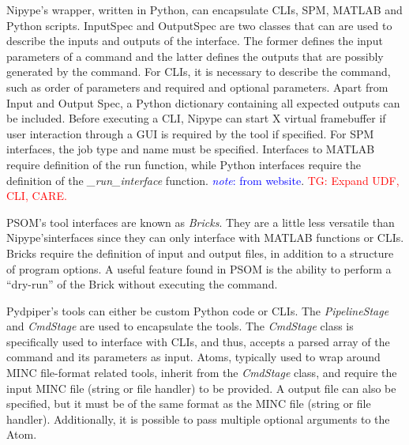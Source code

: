 \documentclass{report}
\newcommand{\note}[1]{\textcolor{blue}{\textit{note}: #1}}
\newcommand{\tristan}[1]{\textcolor{red}{TG: #1}}
\begin{document}
            Nipype's wrapper, written in Python, can encapsulate CLIs, SPM, 
            MATLAB and Python scripts. InputSpec and OutputSpec are two classes 
            that can are used to describe the inputs and outputs of the 
            interface. The former defines the input parameters of 
            a command and the latter defines the outputs that are possibly 
            generated by the command. For CLIs, it is necessary to describe the
            command, such as order of parameters and required and optional parameters. 
            Apart from Input and Output Spec, a Python dictionary containing all
            expected outputs can be included.
            Before executing a CLI, Nipype can start X virtual framebuffer if 
            user interaction through a GUI is required by the tool if specified. 
            For SPM interfaces, the job 
            type and name must be specified. Interfaces to MATLAB require 
            definition of the run function, while Python interfaces require
            the definition of the \textit{\_run\_interface} function. \note{from
            website}.
            \tristan{Expand UDF, CLI, CARE.}
            
            PSOM’s tool interfaces are known as \textit{Bricks}. They are a 
            little less versatile than Nipype'sinterfaces since they can only
            interface with MATLAB functions or CLIs. Bricks require the 
            definition of input and output files, in addition to a structure of 
            program options. A useful feature found in PSOM is the ability to 
            perform a “dry-run” of the Brick without executing the command.

            Pydpiper's tools can either be custom Python code or CLIs. The 
            \textit{PipelineStage} and \textit{CmdStage} are used to 
            encapsulate the tools. The \textit{CmdStage} class is specifically 
            used to interface with CLIs, and thus, accepts a parsed array of the
            command and its parameters as input. Atoms, typically used to wrap
            around MINC file-format related tools, inherit from the
            \textit{CmdStage} class, and require the input MINC file (string or
            file handler) to be provided. A output file can also be specified, 
            but it must be of the same format as the MINC file (string or file 
            handler). Additionally, it is possible to pass multiple optional 
            arguments to the Atom.
\end{document}
